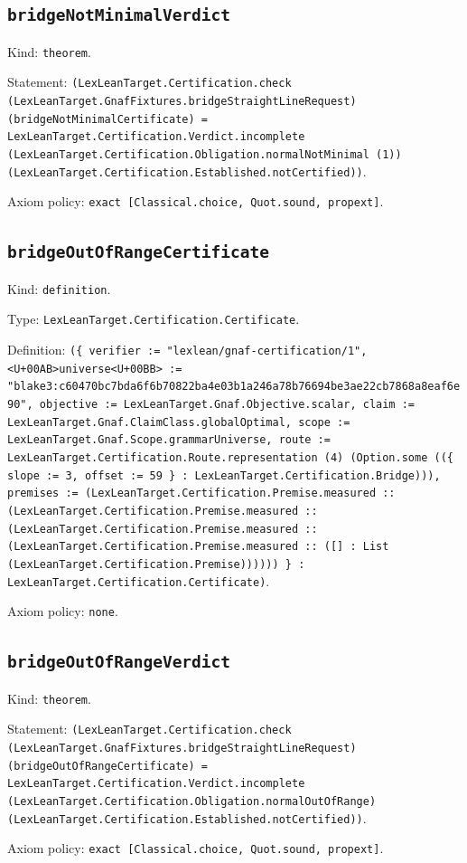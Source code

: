 \documentclass[11pt]{article}
\begin{document}
\subsection*{\texttt{bridgeNotMinimalVerdict}}
\noindent Kind: \texttt{theorem}.\par
\noindent Statement: \texttt{(LexLeanTarget.Certification.check (LexLeanTarget.GnafFixtures.bridgeStraightLineRequest) (bridgeNotMinimalCertificate) = LexLeanTarget.Certification.Verdict.incomplete (LexLeanTarget.Certification.Obligation.normalNotMinimal (1)) (LexLeanTarget.Certification.Established.notCertified))}.\par
\noindent Axiom policy: \texttt{exact [Classical.choice, Quot.sound, propext]}.\par
\subsection*{\texttt{bridgeOutOfRangeCertificate}}
\noindent Kind: \texttt{definition}.\par
\noindent Type: \texttt{LexLeanTarget.Certification.Certificate}.\par
\noindent Definition: \texttt{(\{ verifier := "lexlean/gnaf-certification/1", <U+00AB>universe<U+00BB> := "blake3:c60470bc7bda6f6b70822ba4e03b1a246a78b76694be3ae22cb7868a8eaf6e90", objective := LexLeanTarget.Gnaf.Objective.scalar, claim := LexLeanTarget.Gnaf.ClaimClass.globalOptimal, scope := LexLeanTarget.Gnaf.Scope.grammarUniverse, route := LexLeanTarget.Certification.Route.representation (4) (Option.some ((\{ slope := 3, offset := 59 \} : LexLeanTarget.Certification.Bridge))), premises := (LexLeanTarget.Certification.Premise.measured :: (LexLeanTarget.Certification.Premise.measured :: (LexLeanTarget.Certification.Premise.measured :: (LexLeanTarget.Certification.Premise.measured :: ([] : List (LexLeanTarget.Certification.Premise)))))) \} : LexLeanTarget.Certification.Certificate)}.\par
\noindent Axiom policy: \texttt{none}.\par
\subsection*{\texttt{bridgeOutOfRangeVerdict}}
\noindent Kind: \texttt{theorem}.\par
\noindent Statement: \texttt{(LexLeanTarget.Certification.check (LexLeanTarget.GnafFixtures.bridgeStraightLineRequest) (bridgeOutOfRangeCertificate) = LexLeanTarget.Certification.Verdict.incomplete (LexLeanTarget.Certification.Obligation.normalOutOfRange) (LexLeanTarget.Certification.Established.notCertified))}.\par
\noindent Axiom policy: \texttt{exact [Classical.choice, Quot.sound, propext]}.\par
\end{document}
